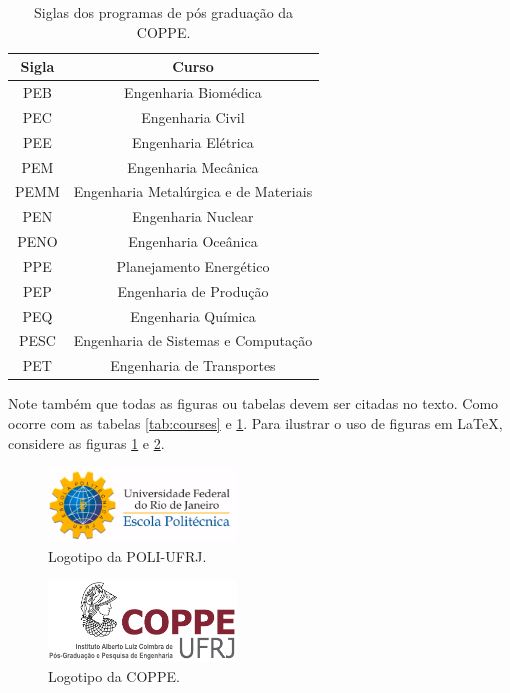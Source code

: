 \documentclass[grad,numbers]{coppe}
\begin{document}
  
  \begin{table}[h]
  	\caption{Siglas dos programas de pós graduação da COPPE.}
  	\label{tab:programs}
  	\centering
  	{\footnotesize
  		\begin{tabular}{|c|c|}
  			\hline
  			Sigla & Curso\\
  			\hline
  			PEB & Engenharia Biomédica \\
  			PEC & Engenharia Civil\\
  			PEE & Engenharia Elétrica \\
  			PEM & Engenharia Mecânica \\
  			PEMM & Engenharia Metalúrgica e de Materiais\\
  			PEN & Engenharia Nuclear\\
  			PENO & Engenharia Oceânica\\
  			PPE & Planejamento Energético\\
  			PEP & Engenharia de Produção\\
  			PEQ & Engenharia Química\\
  			PESC & Engenharia de Sistemas e Computação\\
  			PET & Engenharia de Transportes\\
  			\hline
  	\end{tabular}}
  \end{table}
  
  
  Note também que todas as figuras ou tabelas devem ser citadas no texto. Como ocorre com as tabelas \ref{tab:courses} e \ref{tab:programs}. Para ilustrar o uso de figuras em \LaTeX, considere as figuras \ref{fig:poli} e \ref{fig:coppe}.
  
  \begin{figure}
  	\centering
  	\includegraphics[width=5cm]{poli-logo.pdf}
  	\caption{Logotipo da POLI-UFRJ.}
  	\label{fig:poli}
  \end{figure}
  
  \begin{figure}
  	\centering
  	\includegraphics[width=5cm]{coppe-logo.pdf}
  	\caption{Logotipo da COPPE.}
  	\label{fig:coppe}
  \end{figure}
  
\end{document}
